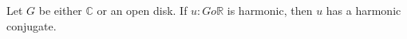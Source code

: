 Let $G$ be either $\mathbb{C}$ or an open disk. If $u: G 	o \mathbb{R}$ is harmonic, then $u$ has a harmonic conjugate.
